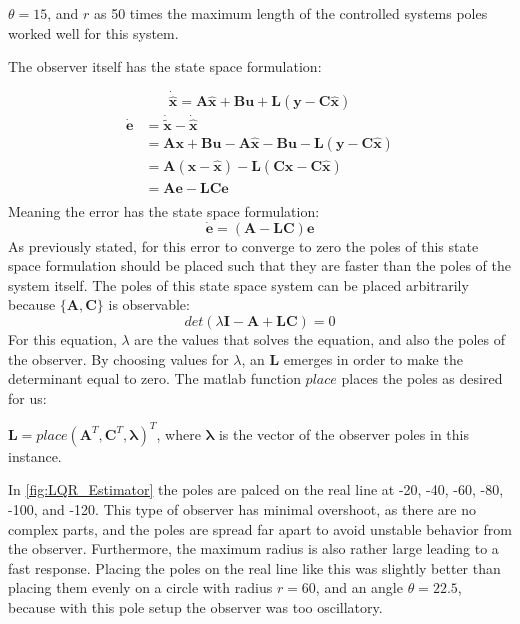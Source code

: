 $\theta = 15$, and $r$ as 50 times the maximum length of the
controlled systems poles worked well for this system.

The observer itself has the state space formulation:

\begin{equation*}
  \dot{\hat{\bm{x}}} = \bm{A}\hat{\bm{x}}+\bm{B}\bm{u} + \bm{L}(\bm{y}
  - \bm{C}\hat{\bm{x}})
\end{equation*}
\begin{align*}
  \dot{\bm{e}} &= \dot{\bm{\tilde{x}}} - \dot{\hat{\bm{x}}} \\
               &= \bm{Ax} + \bm{Bu} - \bm{A}\hat{\bm{x}} - \bm{Bu} - \bm{L}(\bm{y}- \bm{C}\hat{\bm{x}}) \\
               &= \bm{A}(\bm{x} - \hat{\bm{x}}) - \bm{L}(\bm{C}\bm{x}- \bm{C}\hat{\bm{x}}) \\
               &= \bm{Ae} - \bm{LCe} \\
\end{align*}
Meaning the error has the state space formulation:
\begin{equation}
  \dot{\bm{e}} = (\bm{A} - \bm{LC})\bm{e}
\end{equation}
As previously stated, for this error to converge to zero the poles of this state space formulation should be placed such that they are
faster than the poles of the system itself. The poles of this state
space system can be placed arbitrarily because $\{\bm{A},\bm{C}\}$ is
observable:
\begin{equation*}
  det(\lambda\bm{I} - \bm{A} +\bm{LC}) = 0
\end{equation*}
For this equation, $\lambda$ are the values that solves the equation,
and also the poles of the observer. By choosing values for $\lambda$,
an $\bm{L}$ emerges in order to make the determinant equal to
zero. The matlab function $place$ places the poles as desired for us:

$\bm{L} = place(\bm{A}^T,\bm{C}^T,\bm{\lambda})^T$, where
$\bm{\lambda}$ is the vector of the observer poles in this instance.

In \cref{fig:LQR_Estimator} the poles are palced on the real line at -20, -40, -60, -80, -100, and -120. This type of observer has minimal overshoot, as there are no complex parts, and the poles are spread far apart to avoid unstable behavior from the observer. Furthermore, the maximum radius is also rather large leading to a fast response. Placing the poles on the real line like this was slightly better than placing them evenly on a circle with radius $r = 60$, and an angle $\theta = 22.5$, because with this pole setup the observer was too oscillatory.

